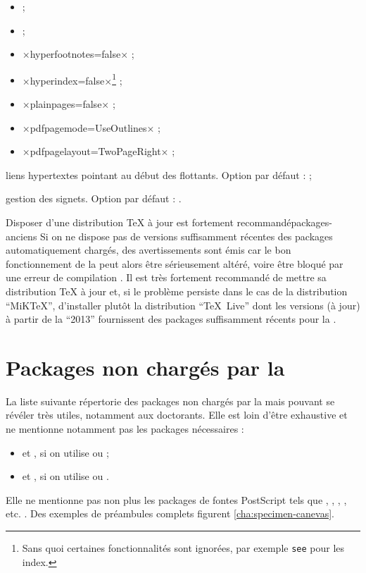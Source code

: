 \begin{description}
\begin{itemize}
  \item {} ;
  \item {} ;
  \item ×hyperfootnotes=false× ;
  \item ×hyperindex=false×\footnote{Sans quoi certaines fonctionnalités sont
      ignorées, par exemple \protect\lstinline|see| pour les index.} ;
  \item ×plainpages=false× ;
  \item ×pdfpagemode=UseOutlines× ;
  \item ×pdfpagelayout=TwoPageRight× ;
  \end{itemize}
\item[\package{hypcap} :] liens hypertextes pointant au début des
  flottants\ifscreenoutput. Option par défaut :  ;
\item[\package{bookmark} :] gestion des signets\ifscreenoutput. Option par
  défaut : .
\end{description}

\begin{dbremark}{Disposer d'une distribution \TeX{} à jour est fortement
    recommandé}{packages-anciens}
  Si on ne dispose pas de versions suffisamment récentes des packages
  automatiquement chargés, des avertissements sont émis car le bon
  fonctionnement de la \yatcl{} peut alors être sérieusement altéré, voire être
  bloqué par une erreur de compilation . Il
  est très fortement recommandé de mettre sa distribution \TeX{} à jour et, si
  le problème persiste dans le cas de la distribution \enquote{MiK\TeX{}},
  d'installer plutôt la distribution \enquote{\TeX~Live} dont les versions (à
  jour) à partir de la \enquote{2013} fournissent des packages suffisamment
  récents pour la \yatcl.
\end{dbremark}

\section{Packages non chargés par la \yatcl{}}

La liste suivante répertorie des packages non chargés par la \yatcl{} mais
pouvant se révéler très utiles, notamment aux doctorants.  Elle est loin d'être
exhaustive et ne mentionne notamment pas les packages nécessaires :
\begin{itemize}
\item {} et , si on utilise  ou
   ;
\item {} et , si on utilise 
  ou .
\end{itemize}
Elle ne mentionne pas non plus les packages de fontes PostScript tels que
, , , ,
etc. . Des exemples de préambules complets figurent
\vref{cha:specimen-canevas}.

